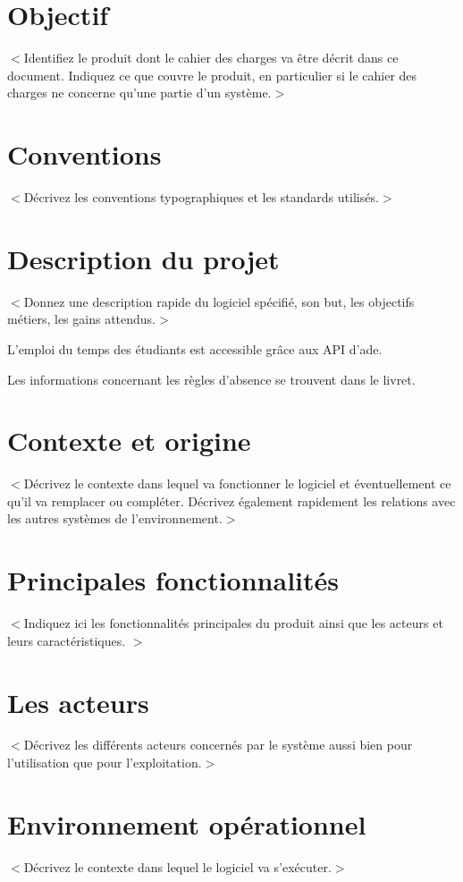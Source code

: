 \documentclass{scrreprt}
\begin{document}
\section{Objectif}
$<$Identifiez le produit dont le cahier des charges va être décrit dans ce document. Indiquez ce que couvre le produit, en particulier si le cahier des charges ne concerne qu'une partie d'un système.$>$

\section{Conventions}
$<$Décrivez les conventions typographiques et les standards utilisés.$>$

\section{Description du projet}
$<$Donnez une description rapide du logiciel spécifié, son but, les objectifs métiers, les gains attendus.$>$

L'emploi du temps des étudiants est accessible grâce aux \acrshort{API} d'\acrshort{ade}.

Les informations concernant les règles d'absence se trouvent dans le \Gls{livret}.

\section{Contexte et origine}
$<$Décrivez le contexte dans lequel va fonctionner le logiciel et éventuellement ce qu'il va remplacer ou compléter. Décrivez également rapidement les relations avec les autres systèmes de l'environnement.$>$

\section{Principales fonctionnalités}
$<$Indiquez ici les fonctionnalités principales du produit ainsi que les acteurs et leurs caractéristiques. $>$

\section{Les acteurs}
$<$Décrivez les différents acteurs concernés par le système aussi bien pour l'utilisation que pour l'exploitation.$>$

\section{Environnement opérationnel}
$<$Décrivez le contexte dans lequel le logiciel va s'exécuter.$>$
\end{document}
